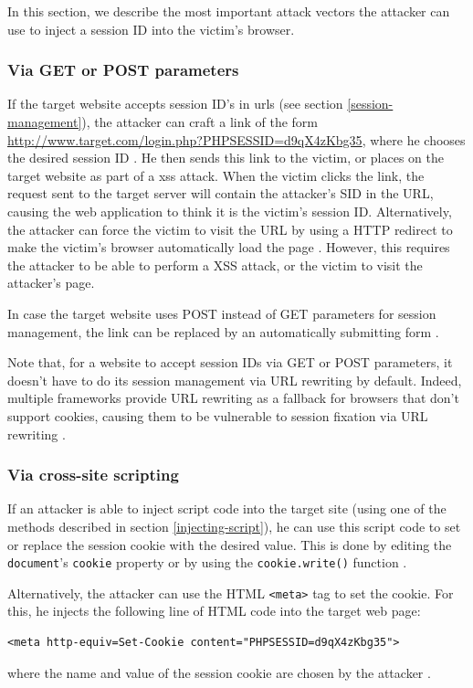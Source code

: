 In this section, we describe the most important attack vectors the attacker can use to inject a session ID into the victim's browser.

\subsubsection{Via GET or POST parameters}

If the target website accepts session ID's in \glspl{url} (see section \ref{session-management}), the attacker can craft a link of the form \url{http://www.target.com/login.php?PHPSESSID=d9qX4zKbg35}, where he chooses the desired session ID \cite{Johns2011}. He then sends this link to the victim, or places on the target website as part of a \gls{xss} attack. When the victim clicks the link, the request sent to the target server will contain the attacker's SID in the URL, causing the web application to think it is the victim's session ID. Alternatively, the attacker can force the victim to visit the URL by using a HTTP redirect \cite{rfc2616} to make the victim's browser automatically load the page \cite{Shiflett2004}. However, this requires the attacker to be able to perform a XSS attack, or the victim to visit the attacker's page.

In case the target website uses POST instead of GET parameters for session management, the link can be replaced by an automatically submitting form \cite{Kolsek2002,Bontrager2005}.

Note that, for a website to accept session IDs via GET or POST parameters, it doesn't have to do its session management via URL rewriting by default. Indeed, multiple frameworks provide URL rewriting as a fallback for browsers that don't support cookies, causing them to be vulnerable to session fixation via URL rewriting \cite{Condit2006,Holovaty2008}.

\subsubsection{Via cross-site scripting}

If an attacker is able to inject script code into the target site (using one of the methods described in section \ref{injecting-script}), he can use this script code to set or replace the \gls{session cookie} with the desired value. This is done by editing the \texttt{document}'s \texttt{cookie} property \cite{Kolsek2002} or by using the \texttt{cookie.write()} function \cite{Johns2011}.

Alternatively, the attacker can use the HTML \texttt{<meta>} tag to set the cookie. For this, he injects the following line of HTML code into the target web page:
\begin{lstlisting}
<meta http-equiv=Set-Cookie content="PHPSESSID=d9qX4zKbg35">
\end{lstlisting}
where the name and value of the session cookie are chosen by the attacker \cite{Kolsek2002}.

